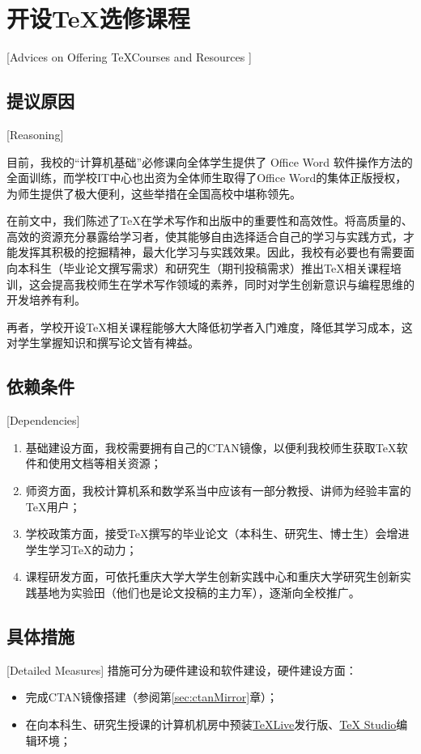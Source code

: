 \section{开设\TeX 选修课程}[Advices on Offering \TeX Courses and Resources ]\label{sec:texCourses}
\subsection{提议原因}[Reasoning]

目前，我校的“计算机基础”必修课向全体学生提供了 Office Word 软件操作方法的全面训练，而学校IT中心也出资为全体师生取得了Office Word的集体正版授权，为师生提供了极大便利，这些举措在全国高校中堪称领先。

在前文中，我们陈述了\TeX 在学术写作和出版中的重要性和高效性。将高质量的、高效的资源充分暴露给学习者，使其能够自由选择适合自己的学习与实践方式，才能发挥其积极的挖掘精神，最大化学习与实践效果。因此，我校有必要也有需要面向本科生（毕业论文撰写需求）和研究生（期刊投稿需求）推出\TeX 相关课程培训，这会提高我校师生在学术写作领域的素养，同时对学生创新意识与编程思维的开发培养有利。

再者，学校开设\TeX 相关课程能够大大降低初学者入门难度，降低其学习成本，这对学生掌握知识和撰写论文皆有裨益。

\subsection{依赖条件}[Dependencies]
\begin{enumerate}
	\item 基础建设方面，我校需要拥有自己的CTAN镜像，以便利我校师生获取\TeX 软件和使用文档等相关资源；
	\item 师资方面，我校计算机系和数学系当中应该有一部分教授、讲师为经验丰富的\TeX 用户；
	\item 学校政策方面，接受\TeX 撰写的毕业论文（本科生、研究生、博士生）会增进学生学习\TeX 的动力；
	\item 课程研发方面，可依托重庆大学大学生创新实践中心和重庆大学研究生创新实践基地为实验田（他们也是论文投稿的主力军），逐渐向全校推广。
\end{enumerate}

\subsection{具体措施}[Detailed Measures]
措施可分为硬件建设和软件建设，硬件建设方面：
\begin{itemize}
	\item 完成CTAN镜像搭建（参阅第\ref{sec:ctanMirror}章）；
	\item 在向本科生、研究生授课的计算机机房中预装\href{https://en.wikipedia.org/wiki/TeX_Live}{\TeX Live}发行版、\href{http://www.texstudio.org/}{TeX Studio}编辑环境；
\end{itemize}

